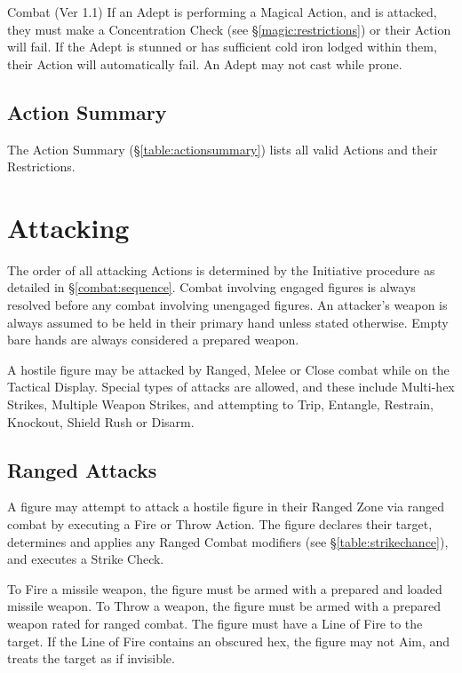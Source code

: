 \begin{Chapter}{Combat (Ver 1.1)}
If an Adept is performing a Magical Action, and is attacked, they must
make a Concentration Check (see \S\ref{magic:restrictions}) or their
Action will fail.  If the Adept is stunned or has sufficient cold iron
lodged within them, their Action will automatically fail.  An Adept
may not cast while prone.

\subsection{Action Summary}

The Action Summary (\S\ref{table:actionsummary}) lists all valid
Actions and their Restrictions.

\section{Attacking}
\label{combat:attacking}

The order of all attacking Actions is determined by the Initiative
procedure as detailed in \S\ref{combat:sequence}.  Combat involving
engaged figures is always resolved before any combat involving
unengaged figures.  An attacker’s weapon is always assumed to be held
in their primary hand unless stated otherwise.  Empty bare hands are
always considered a prepared weapon.

A hostile figure may be attacked by Ranged, Melee or Close combat
while on the Tactical Display.  Special types of attacks are allowed,
and these include Multi-hex Strikes, Multiple Weapon Strikes, and
attempting to Trip, Entangle, Restrain, Knockout, Shield Rush or
Disarm.

\subsection{Ranged Attacks}

A figure may attempt to attack a hostile figure in their Ranged Zone
via ranged combat by executing a Fire or Throw Action.  The figure
declares their target, determines and applies any Ranged Combat
modifiers (see \S\ref{table:strikechance}), and executes a Strike
Check.

To Fire a missile weapon, the figure must be armed with a prepared and
loaded missile weapon.  To Throw a weapon, the figure must be armed
with a prepared weapon rated for ranged combat.  The figure must have
a Line of Fire to the target. If the Line of Fire contains an obscured
hex, the figure may not Aim, and treats the target as if invisible.


\end{Chapter}
